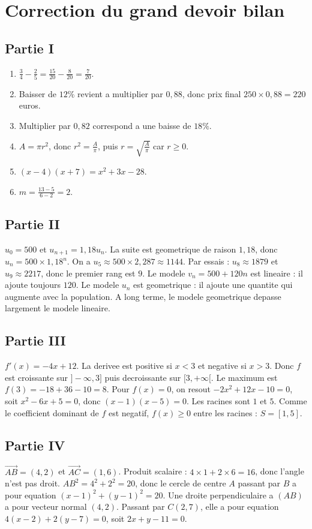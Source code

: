\documentclass[11pt,a4paper]{article}
\newcommand{\vect}[1]{\overrightarrow{#1}}
\begin{document}
\newpage
\section{Correction du grand devoir bilan}

\subsection*{Partie I}
\begin{enumerate}
  \item $\frac34-\frac25=\frac{15}{20}-\frac{8}{20}=\frac7{20}$.
  \item Baisser de $12\%$ revient a multiplier par $0,88$, donc prix final $250\times0,88=220$ euros.
  \item Multiplier par $0,82$ correspond a une baisse de $18\%$.
  \item $A=\pi r^2$, donc $r^2=\frac A\pi$, puis $r=\sqrt{\frac A\pi}$ car $r\ge0$.
  \item $(x-4)(x+7)=x^2+3x-28$.
  \item $m=\frac{13-5}{6-2}=2$.
\end{enumerate}

\subsection*{Partie II}
$u_0=500$ et $u_{n+1}=1,18u_n$. La suite est geometrique de raison $1,18$, donc $u_n=500\times1,18^n$. On a $u_5\approx500\times2,287\approx1144$. Par essais : $u_8\approx1879$ et $u_9\approx2217$, donc le premier rang est $9$. Le modele $v_n=500+120n$ est lineaire : il ajoute toujours $120$. Le modele $u_n$ est geometrique : il ajoute une quantite qui augmente avec la population. A long terme, le modele geometrique depasse largement le modele lineaire.

\subsection*{Partie III}
$f'(x)=-4x+12$. La derivee est positive si $x<3$ et negative si $x>3$. Donc $f$ est croissante sur $]-\infty,3]$ puis decroissante sur $[3,+\infty[$. Le maximum est $f(3)=-18+36-10=8$. Pour $f(x)=0$, on resout $-2x^2+12x-10=0$, soit $x^2-6x+5=0$, donc $(x-1)(x-5)=0$. Les racines sont $1$ et $5$. Comme le coefficient dominant de $f$ est negatif, $f(x)\ge0$ entre les racines : $S=[1,5]$.

\subsection*{Partie IV}
$\vect{AB}=(4,2)$ et $\vect{AC}=(1,6)$. Produit scalaire : $4\times1+2\times6=16$, donc l'angle n'est pas droit. $AB^2=4^2+2^2=20$, donc le cercle de centre $A$ passant par $B$ a pour equation $(x-1)^2+(y-1)^2=20$. Une droite perpendiculaire a $(AB)$ a pour vecteur normal $(4,2)$. Passant par $C(2,7)$, elle a pour equation $4(x-2)+2(y-7)=0$, soit $2x+y-11=0$.
\end{document}
